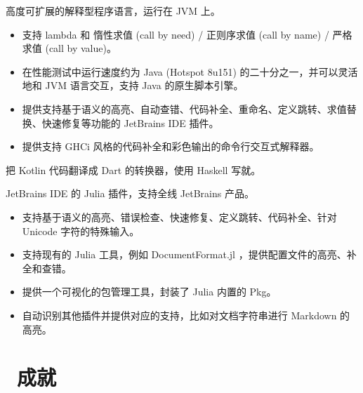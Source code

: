 \documentclass{resume}
\begin{document}
高度可扩展的解释型程序语言，运行在 JVM 上。
\begin{itemize}
  \item 支持 lambda 和 惰性求值 (call by need) / 正则序求值 (call by name) / 严格求值 (call by value)。
  \item 在性能测试中运行速度约为 Java (Hotspot 8u151) 的二十分之一，并可以灵活地和 JVM 语言交互，支持 Java 的原生脚本引擎。
  \item 提供支持基于语义的高亮、自动查错、代码补全、重命名、定义跳转、求值替换、快速修复等功能的 JetBrains IDE 插件。
  \item 提供支持 GHCi 风格的代码补全和彩色输出的命令行交互式解释器。
\end{itemize}

把 Kotlin 代码翻译成 Dart 的转换器，使用 Haskell 写就。

JetBrains IDE 的 Julia 插件，支持全线 JetBrains 产品。
\begin{itemize}
  \item 支持基于语义的高亮、错误检查、快速修复、定义跳转、代码补全、针对 Unicode 字符的特殊输入。
  \item 支持现有的 Julia 工具，例如 DocumentFormat.jl ，提供配置文件的高亮、补全和查错。
  \item 提供一个可视化的包管理工具，封装了 Julia 内置的 Pkg。
  \item 自动识别其他插件并提供对应的支持，比如对文档字符串进行 Markdown 的高亮。
\end{itemize}


\section{\faHeartO\ 成就}
\end{document}

